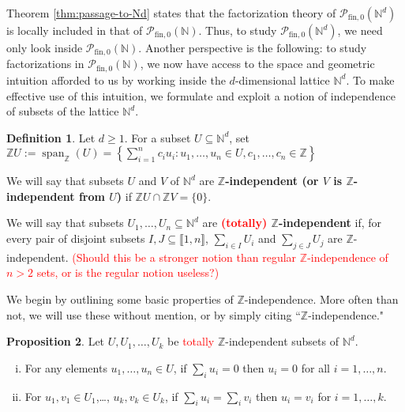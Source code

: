 \documentclass{report}
\newcommand{\NN}{\mathbb{N}}
\renewcommand{\P}{\mathcal{P}}
\newcommand{\ZZ}{\mathbb{Z}}
\newcommand{\llb}{\llbracket}
\newcommand{\rrb}{\rrbracket}
\newcommand{\fin}{\textrm{fin}}
\newcommand{\fon}{{\textrm{fin}, 0}}
\renewcommand{\:}{\text{:}}
\newcommand{\PN}{{\P_{\fin,0}(\NN)}}
\theoremstyle{definition}
\newtheorem{defn}{Definition}[section]
\newtheorem{prop}[defn]{Proposition}
\begin{document}
Theorem \ref{thm:passage-to-Nd} states that the factorization theory of $\P_\fon(\NN^d)$ is locally included in that of $\PN$.
Thus, to study $\P_\fon(\NN^d)$, we need only look inside $\PN$. 
Another perspective is the following: to study factorizations in $\PN$, we now have access to the space and geometric intuition afforded to us by working inside the $d$-dimensional lattice $\NN^d$.
To make effective use of this intuition, we formulate and exploit a notion of independence of subsets of the lattice $\NN^d$.
\begin{defn}
Let $d\ge 1$.  
For a subset $U \subseteq \NN^d$, set $\ZZ U := \operatorname{span}_\ZZ(U) = \left\{\sum_{i=1}^n c_i u_i : u_1,\dots, u_n\in U, c_1,\dots, c_n\in \ZZ \right\}$

We will say that subsets $U$ and $V$ of $\NN^d$ are \textbf{$\ZZ$-independent (or $V$ is $\ZZ$-independent from $U$)} if $\ZZ U \cap \ZZ V = \{0\}$.

We will say that subsets $U_1,\dots, U_n\subseteq \NN^d$ are \textbf{\textcolor{red}{(totally)} $\ZZ$-independent} if, for every pair of disjoint subsets $I,J\subseteq\llb 1,n \rrb$, $\sum_{i\in I} U_i$ and $\sum_{j\in J} U_j$ are $\ZZ$-independent. \textcolor{red}{(Should this be a stronger notion than regular $\ZZ$-independence of $n>2$ sets, or is the regular notion useless?)}
\end{defn}

We begin by outlining some basic properties of $\ZZ$-independence.  
More often than not, we will use these without mention, or by simply citing ``$\ZZ$-independence."
\begin{prop} \label{prop:eltwise-indep}
Let $U, U_1,\dots, U_k$ be \textcolor{red}{totally} $\ZZ$-independent subsets of $\NN^d$.
\begin{enumerate}[(i)]
	\item For any elements $u_1,\dots, u_n\in U$, if $\sum_i u_i = 0$ then $u_i = 0$ for all $i=1,\dots, n$.
	\item For $u_1,v_1\in U_1$,\dots, $u_k,v_k\in U_k$, if $\sum_i u_i = \sum_i v_i$ then $u_i = v_i$ for $i = 1,\dots, k$.
\end{enumerate}
\end{prop}
\end{document}

